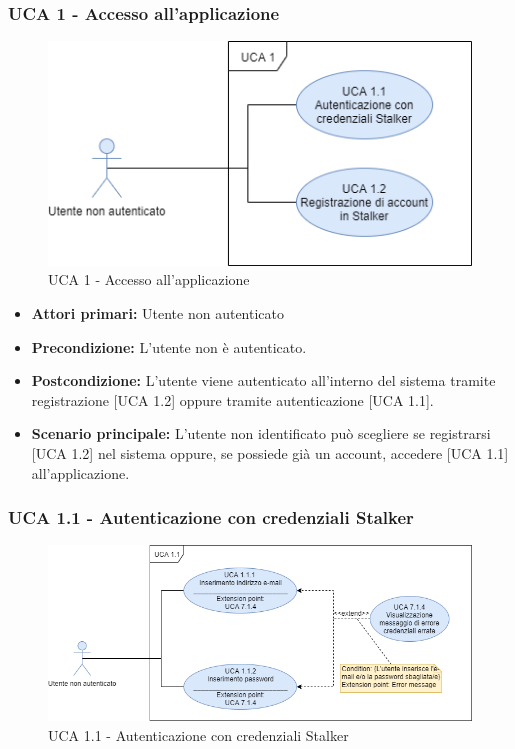 \subsubsection{UCA 1 - Accesso all'applicazione}%

\begin{figure}[h]
  \centering
    \includegraphics[scale=0.7]{sezioni/UseCase/Immagini/UCA1.png}
  \caption{UCA 1 - Accesso all'applicazione}
\end{figure}

\begin{itemize}
\item \textbf{Attori primari:} Utente non autenticato
\item \textbf{Precondizione:} L'utente non è autenticato.
\item \textbf{Postcondizione:} L'utente viene autenticato all'interno del sistema tramite registrazione [UCA 1.2] oppure tramite autenticazione [UCA 1.1].
\item \textbf{Scenario principale:} L'utente non identificato può scegliere se registrarsi [UCA 1.2] nel sistema oppure, se possiede già un account, accedere [UCA 1.1] all'applicazione. %
\end{itemize}

\subsubsection{UCA 1.1 - Autenticazione con credenziali Stalker}%

\begin{figure}[h]

  \centering
    \includegraphics[scale=0.5]{sezioni/UseCase/Immagini/UCA1.1.png}
  \caption{UCA 1.1 - Autenticazione con credenziali Stalker}
\end{figure}

